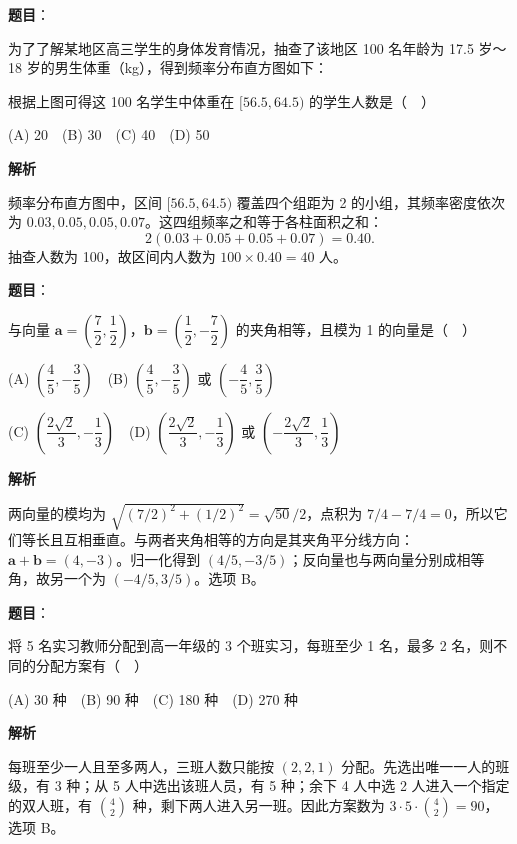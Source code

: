 \begin{answer}

\textbf{题目}：

为了了解某地区高三学生的身体发育情况，抽查了该地区 100 名年龄为 17.5 岁～18 岁的男生体重（kg），得到频率分布直方图如下：
\nopagebreak[4]
\begin{center}\end{center}
\nopagebreak[4]
根据上图可得这 100 名学生中体重在 \([56.5,64.5)\) 的学生人数是（　）

(A) 20　(B) 30　(C) 40　(D) 50

\textbf{解析}

频率分布直方图中，区间 \([56.5,64.5)\) 覆盖四个组距为 2 的小组，其频率密度依次为 \(0.03,0.05,0.05,0.07\)。这四组频率之和等于各柱面积之和：
\nopagebreak[4]
\[
2(0.03+0.05+0.05+0.07)=0.40.
\]
抽查人数为 100，故区间内人数为 \(100\times0.40=40\) 人。


\end{answer}
\begin{answer}

\textbf{题目}：

与向量 \(\boldsymbol a=\left(\dfrac72,\dfrac12\right)\)，\(\boldsymbol b=\left(\dfrac12,-\dfrac72\right)\) 的夹角相等，且模为 1 的向量是（　）

(A) \(\left(\dfrac45,-\dfrac35\right)\)　(B) \(\left(\dfrac45,-\dfrac35\right)\) 或 \(\left(-\dfrac45,\dfrac35\right)\)

(C) \(\left(\dfrac{2\sqrt2}{3},-\dfrac13\right)\)　(D) \(\left(\dfrac{2\sqrt2}{3},-\dfrac13\right)\) 或 \(\left(-\dfrac{2\sqrt2}{3},\dfrac13\right)\)

\textbf{解析}

两向量的模均为 \(\sqrt{(7/2)^2+(1/2)^2}=\sqrt{50}/2\)，点积为 \(7/4-7/4=0\)，所以它们等长且互相垂直。与两者夹角相等的方向是其夹角平分线方向：\(\boldsymbol a+\boldsymbol b=(4, -3)\)。归一化得到 \((4/5,-3/5)\)；反向量也与两向量分别成相等角，故另一个为 \((-4/5,3/5)\)。选项 B。


\end{answer}
\begin{answer}

\textbf{题目}：

将 5 名实习教师分配到高一年级的 3 个班实习，每班至少 1 名，最多 2 名，则不同的分配方案有（　）

(A) 30 种　(B) 90 种　(C) 180 种　(D) 270 种

\textbf{解析}

每班至少一人且至多两人，三班人数只能按 \((2,2,1)\) 分配。先选出唯一一人的班级，有 3 种；从 5 人中选出该班人员，有 5 种；余下 4 人中选 2 人进入一个指定的双人班，有 \(\binom42\) 种，剩下两人进入另一班。因此方案数为 \(3\cdot5\cdot\binom42=90\)，选项 B。


\end{answer}
